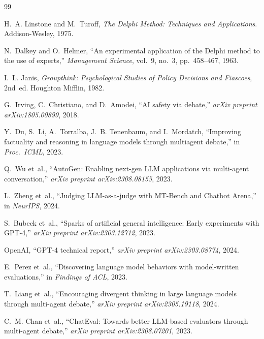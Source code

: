 \documentclass[11pt,a4paper]{article}
\begin{document}
\begin{thebibliography}{99}

H.~A. Linstone and M.~Turoff, \emph{The Delphi Method: Techniques and Applications}. Addison-Wesley, 1975.

N.~Dalkey and O.~Helmer, ``An experimental application of the Delphi method to the use of experts,'' \emph{Management Science}, vol.~9, no.~3, pp.~458--467, 1963.

I.~L. Janis, \emph{Groupthink: Psychological Studies of Policy Decisions and Fiascoes}, 2nd~ed. Houghton Mifflin, 1982.

G.~Irving, C.~Christiano, and D.~Amodei, ``AI safety via debate,'' \emph{arXiv preprint arXiv:1805.00899}, 2018.

Y.~Du, S.~Li, A.~Torralba, J.~B. Tenenbaum, and I.~Mordatch, ``Improving factuality and reasoning in language models through multiagent debate,'' in \emph{Proc.\ ICML}, 2023.

Q.~Wu et~al., ``AutoGen: Enabling next-gen LLM applications via multi-agent conversation,'' \emph{arXiv preprint arXiv:2308.08155}, 2023.

L.~Zheng et~al., ``Judging LLM-as-a-judge with MT-Bench and Chatbot Arena,'' in \emph{NeurIPS}, 2024.

S.~Bubeck et~al., ``Sparks of artificial general intelligence: Early experiments with GPT-4,'' \emph{arXiv preprint arXiv:2303.12712}, 2023.

OpenAI, ``GPT-4 technical report,'' \emph{arXiv preprint arXiv:2303.08774}, 2024.

E.~Perez et~al., ``Discovering language model behaviors with model-written evaluations,'' in \emph{Findings of ACL}, 2023.

T.~Liang et~al., ``Encouraging divergent thinking in large language models through multi-agent debate,'' \emph{arXiv preprint arXiv:2305.19118}, 2024.

C.~M. Chan et~al., ``ChatEval: Towards better LLM-based evaluators through multi-agent debate,'' \emph{arXiv preprint arXiv:2308.07201}, 2023.


\end{thebibliography}
\end{document}
